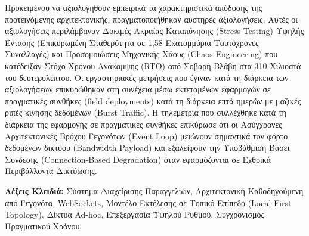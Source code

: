 \begin{abstractGr}
  Προκειμένου να αξιολογηθούν εμπειρικά τα χαρακτηριστικά απόδοσης της προτεινόμενης αρχιτεκτονικής, πραγματοποιήθηκαν αυστηρές αξιολογήσεις. Αυτές οι αξιολογήσεις περιλάμβαναν Δοκιμές Ακραίας Καταπόνησης (Stress Testing) Υψηλής Έντασης (Επικυρωμένη Σταθερότητα σε 1,58 Εκατομμύρια Ταυτόχρονες Συναλλαγές) και Προσομοιώσεις Μηχανικής Χάους (Chaos Engineering) που κατέδειξαν Στόχο Χρόνου Ανάκαμψης (RTO) από Σοβαρή Βλάβη στα 310 Χιλιοστά του δευτερολέπτου. Οι εργαστηριακές μετρήσεις που έγιναν κατά τη διάρκεια των αξιολογήσεων επικυρώθηκαν στη συνέχεια μέσω εκτεταμένων εφαρμογών σε πραγματικές συνθήκες (field deployments) κατά τη διάρκεια επτά ημερών με μαζικές ριπές κίνησης δεδομένων (Burst Traffic). Η τηλεμετρία που συλλέχθηκε κατά τη διάρκεια της εφαρμογής σε πραγματικές συνθήκες επικύρωσε ότι οι Ασύγχρονες Αρχιτεκτονικές Βρόχου Γεγονότων (Event Loop) μειώνουν σημαντικά τον φόρτο δεδομένων δικτύου (Bandwidth Payload) και εξαλείφουν την Υποβάθμιση Βάσει Σύνδεσης (Connection-Based Degradation) όταν εφαρμόζονται σε Εχθρικά Περιβάλλοντα Δικτύωσης.
  
  \vspace{1em}
  \textbf{Λέξεις Κλειδιά:} Σύστημα Διαχείρισης Παραγγελιών, Αρχιτεκτονική Καθοδηγούμενη από Γεγονότα, WebSockets, Μοντέλο Εκτέλεσης σε Τοπικό Επίπεδο (Local-First Topology), Δίκτυα Ad-hoc, Επεξεργασία Υψηλού Ρυθμού, Συγχρονισμός Πραγματικού Χρόνου.
\end{abstractGr}
